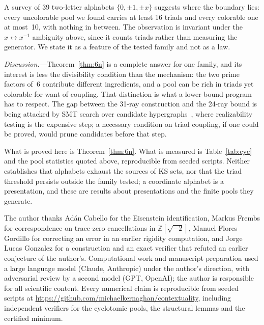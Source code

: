 \documentclass[twocolumn,prl,superscriptaddress,nofootinbib]{revtex4-2}
\newcommand{\Z}{\mathbb{Z}}
\begin{document}
A survey of 39 two-letter alphabets $\{0,\pm1,\pm x\}$ suggests where the
boundary lies: every uncolorable pool we found carries at least 16 triads and
every colorable one at most~10, with nothing in between.  The observation is
invariant under the $x\leftrightarrow x^{-1}$ ambiguity above, since it counts
triads rather than measuring the generator.  We state it as a feature of the
tested family and not as a law.

\textit{Discussion.---}Theorem~\ref{thm:6n} is a complete answer for one family,
and its interest is less the divisibility condition than the mechanism: the two
prime factors of~6 contribute different ingredients, and a pool can be rich in
triads yet colorable for want of coupling.  That distinction is what a
lower-bound program has to respect.  The gap between the 31-ray construction and
the 24-ray bound is being attacked by SMT search over candidate
hypergraphs~\cite{LiBrightGanesh2024,KirchwegerPeitlSzeider2023}, where
realizability testing is the expensive step; a necessary condition on triad
coupling, if one could be proved, would prune candidates before that step.

What is proved here is Theorem~\ref{thm:6n}.  What is measured is
Table~\ref{tab:cyc} and the pool statistics quoted above, reproducible from
seeded scripts.  Neither establishes that alphabets exhaust the sources of KS
sets, nor that the triad threshold persists outside the family tested; a
coordinate alphabet is a presentation, and these are results about presentations
and the finite pools they generate.

\begin{acknowledgments}
The author thanks Ad\'an Cabello for the Eisenstein identification, Markus Frembs
for correspondence on trace-zero cancellations in $\Z[\sqrt{-2}]$, Manuel Flores
Gordillo for correcting an error in an earlier rigidity computation, and Jorge
Lucas Gonzalez for a construction and an exact verifier that refuted an earlier
conjecture of the author's.  Computational work and manuscript preparation used a
large language model (Claude, Anthropic) under the author's direction, with
adversarial review by a second model (GPT, OpenAI); the author is responsible for
all scientific content.  Every numerical claim is reproducible from seeded
scripts at \url{https://github.com/michaelkernaghan/contextuality}, including
independent verifiers for the cyclotomic pools, the structural lemmas and the
certified minimum.
\end{acknowledgments}
\end{document}
